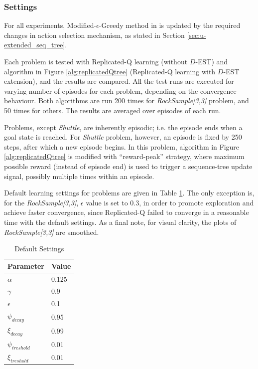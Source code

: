 \documentclass[10pt, conference, compsocconf]{IEEEtran}
\begin{document}
\subsubsection{Settings}

For all experiments, Modified-$\epsilon$-Greedy method in \cite{girgin_improving_2010} is updated by the required changes in action selection mechanism, as stated in Section \ref{sec:u-extended_seq_tree}.

Each problem is tested with Replicated-Q learning (without $D$-EST) and algorithm in Figure \ref{alg:replicatedQtree} (Replicated-Q learning with $D$-EST extension), and the results are compared. All the test runs are executed for varying number of episodes for each problem, depending on the convergence behaviour. Both algorithms are run 200 times for \textit{RockSample[3,3]} problem, and 50 times for others. The results are averaged over episodes of each run. 

Problems, except \textit{Shuttle}, are inherently episodic; i.e. the episode ends when a goal state is reached. For  \textit{Shuttle} problem, however, an episode is fixed by 250 steps, after which a new episode begins. In this problem, algorithm in Figure \ref{alg:replicatedQtree} is modified with ``reward-peak'' strategy, where maximum possible reward (instead of episode end) is used to trigger a sequence-tree update signal, possibly multiple times within an episode.

Default learning settings for problems are given in Table \ref{tab:default_rl_settings}. The only exception is, for the \textit{RockSample[3,3]}, $\epsilon$ value is set to 0.3, in order to promote exploration and achieve faster convergence, since Replicated-Q failed to converge in a reasonable time with the default settings. As a final note, for visual clarity, the plots of \textit{RockSample[3,3]} are smoothed.


\begin{table}[t]
\centering
	\caption{Default Settings}
	\label{tab:default_rl_settings}
	\begin{tabular}{ |l|l|}
		\hline
		\textbf{Parameter} & \textbf{Value} \\ \hline \hline
		$\alpha$ & 0.125 \\ \hline
		$\gamma$ & 0.9 \\ \hline
		$\epsilon$  & 0.1 \\ \hline
		$\psi_{decay}$ & 0.95 \\ \hline
		$\xi_{decay}$ & 0.99 \\ \hline
		$\psi_{treshold}$ & 0.01 \\ \hline
		$\xi_{treshold}$ & 0.01 \\ \hline
	\end{tabular}
\end{table}
\end{document}
